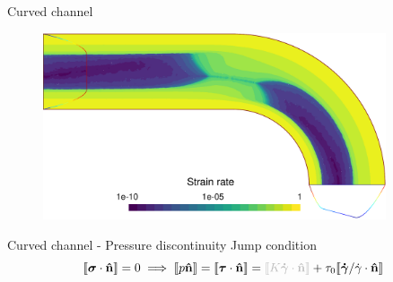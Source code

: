 \documentclass{beamer}  %
\newcommand{\gam}{\boldsymbol{\dot \gamma}}
\newcommand{\nn}{\mathbf{\hat n}}
\begin{document}
\begin{frame}{Curved channel}
    \begin{figure}
        \centering
        \includegraphics[width=0.9\textwidth]{../figures/pipe_strain_v2.pdf}
    \end{figure}
\end{frame}

\begin{frame}{Curved channel - Pressure discontinuity}
    Jump condition 
    \begin{equation*}
        \llbracket\boldsymbol\sigma\cdot \nn \rrbracket = 0 \implies \llbracket p \nn \rrbracket = \llbracket\boldsymbol\tau\cdot \nn \rrbracket = {\color{gray!50} \llbracket K \gam \cdot \nn \rrbracket} + \tau_0 \llbracket \gam/\dot\gamma \cdot \nn \rrbracket
    \end{equation*}
    \begin{figure}
        \begin{overprint}
        \end{overprint}
    \end{figure}
\end{frame}
\end{document}
